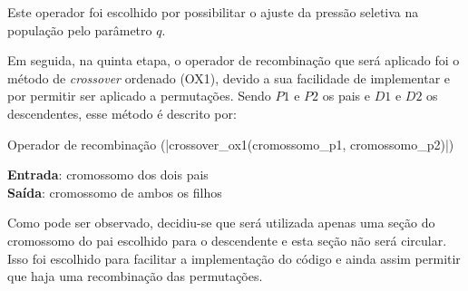 \documentclass[a4paper, 12pt]{article}
\newenvironment{brprocess}[1][]
  {\begin{algorithm}[#1]
     \selectlanguage{brazilian}%
     \floatname{algorithm}{Processo}%
     \renewcommand{\algorithmicif}{\textbf{se}}%
     \renewcommand{\algorithmicfor}{\textbf{para}}%
     \renewcommand{\algorithmicdo}{\textbf{faça}}%
     \renewcommand{\algorithmicthen}{\textbf{faça}}%
     \renewcommand{\algorithmicend}{\textbf{fim}}%
     \renewcommand{\algorithmicwhile}{\textbf{enquanto}}%
     \renewcommand{\algorithmicelse}{\textbf{caso contrário}}%
  }
  {\end{algorithm}}
\begin{document}
Este operador foi escolhido por possibilitar o ajuste da pressão seletiva na população pelo parâmetro $q$.

Em seguida, na quinta etapa, o operador de recombinação que será aplicado foi o método de \textit{crossover} ordenado (OX1), devido a sua facilidade de implementar e por permitir ser aplicado a permutações. Sendo $P1$ e $P2$ os pais e $D1$ e $D2$ os descendentes, esse método é descrito por:
\begin{brprocess}[H]
    \caption{Operador de recombinação (\Pverb|crossover_ox1(cromossomo_p1, cromossomo_p2)|)}
    \textbf{Entrada}: cromossomo dos dois pais\\
    \textbf{Saída}: cromossomo de ambos os filhos
\end{brprocess}

Como pode ser observado, decidiu-se que será utilizada apenas uma seção do cromossomo do pai escolhido para o descendente e esta seção não será circular. Isso foi escolhido para facilitar a implementação do código e ainda assim permitir que haja uma recombinação das permutações.
\end{document}
